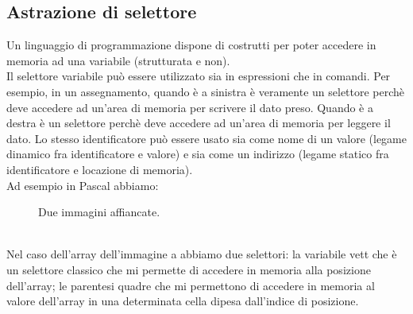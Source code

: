 \documentclass{article}
\begin{document}
	\subsection{Astrazione di selettore}
	Un linguaggio di programmazione dispone di costrutti per poter accedere in memoria ad una variabile (strutturata e non).\\
	Il selettore variabile può essere utilizzato sia in espressioni che in comandi. Per esempio, in un assegnamento, quando è a sinistra è veramente un selettore perchè deve accedere ad un'area di memoria per scrivere il dato preso. Quando è a destra è un selettore perchè deve accedere ad un'area di memoria per leggere il dato.
	Lo stesso identificatore può essere usato sia come nome di un valore (legame dinamico fra identificatore e valore) e sia come un indirizzo (legame statico fra identificatore e locazione di memoria). 
	\vspace{\baselineskip} \\
	Ad esempio in Pascal abbiamo:
	\begin{figure}[h]
		\centering
		 \hfill
		\caption{Due immagini affiancate.}
		\label{fig:subfig}
	\end{figure}
	\vspace{\baselineskip} \\
	Nel caso dell'array dell'immagine a abbiamo due selettori: la variabile vett che è un selettore classico che mi permette di accedere in memoria alla posizione dell'array; le parentesi quadre che mi permettono di accedere in memoria al valore dell'array in una determinata cella dipesa dall'indice di posizione. \\
\end{document}
